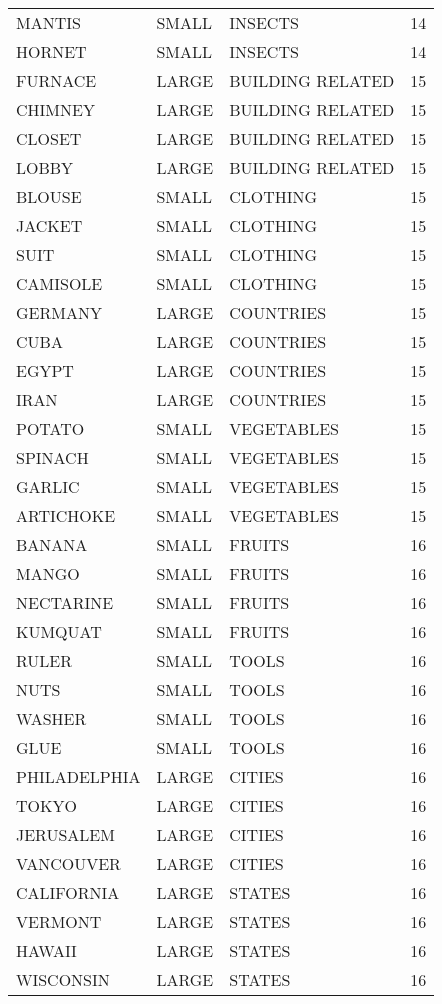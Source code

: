 \begin{tabular}{lllr}
      MANTIS & SMALL &          INSECTS &       14 \\
      HORNET & SMALL &          INSECTS &       14 \\
     FURNACE & LARGE & BUILDING RELATED &       15 \\
     CHIMNEY & LARGE & BUILDING RELATED &       15 \\
      CLOSET & LARGE & BUILDING RELATED &       15 \\
       LOBBY & LARGE & BUILDING RELATED &       15 \\
      BLOUSE & SMALL &         CLOTHING &       15 \\
      JACKET & SMALL &         CLOTHING &       15 \\
        SUIT & SMALL &         CLOTHING &       15 \\
    CAMISOLE & SMALL &         CLOTHING &       15 \\
     GERMANY & LARGE &        COUNTRIES &       15 \\
        CUBA & LARGE &        COUNTRIES &       15 \\
       EGYPT & LARGE &        COUNTRIES &       15 \\
        IRAN & LARGE &        COUNTRIES &       15 \\
      POTATO & SMALL &       VEGETABLES &       15 \\
     SPINACH & SMALL &       VEGETABLES &       15 \\
      GARLIC & SMALL &       VEGETABLES &       15 \\
   ARTICHOKE & SMALL &       VEGETABLES &       15 \\
      BANANA & SMALL &           FRUITS &       16 \\
       MANGO & SMALL &           FRUITS &       16 \\
   NECTARINE & SMALL &           FRUITS &       16 \\
     KUMQUAT & SMALL &           FRUITS &       16 \\
       RULER & SMALL &            TOOLS &       16 \\
        NUTS & SMALL &            TOOLS &       16 \\
      WASHER & SMALL &            TOOLS &       16 \\
        GLUE & SMALL &            TOOLS &       16 \\
PHILADELPHIA & LARGE &           CITIES &       16 \\
       TOKYO & LARGE &           CITIES &       16 \\
   JERUSALEM & LARGE &           CITIES &       16 \\
   VANCOUVER & LARGE &           CITIES &       16 \\
  CALIFORNIA & LARGE &           STATES &       16 \\
     VERMONT & LARGE &           STATES &       16 \\
      HAWAII & LARGE &           STATES &       16 \\
   WISCONSIN & LARGE &           STATES &       16 \\
\bottomrule
\end{tabular}
